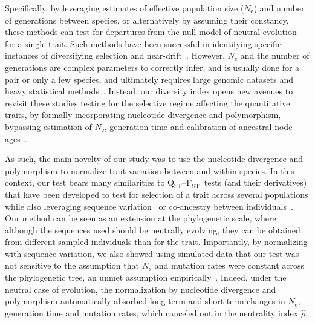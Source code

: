 \documentclass{article}
\newcommand{\Qst}{Q$_\text{ST}$}
\newcommand{\Fst}{F$_\text{ST}$}
\newcommand{\QstFst}{\Qst--\Fst}
\newcommand{\Ne}{N_{\text{e}}}
\newcommand{\NI}{\rho}
\newcommand{\EstNI}{\widehat{\rho}}
\providecommand{\DIFaddtex}[1]{{\protect\color{blue}\uwave{#1}}} %
\providecommand{\DIFdeltex}[1]{{\protect\color{red}\sout{#1}}}                      %
\providecommand{\DIFaddbegin}{} %
\providecommand{\DIFaddend}{} %
\providecommand{\DIFdelbegin}{} %
\providecommand{\DIFdelend}{} %
\providecommand{\DIFadd}[1]{\texorpdfstring{\DIFaddtex{#1}}{#1}} %
\providecommand{\DIFdel}[1]{\texorpdfstring{\DIFdeltex{#1}}{}} %
\newcommand{\DIFscaledelfig}{0.5}
\newlength{\DIFdelgraphicswidth} %
\newlength{\DIFdelgraphicsheight} %
\newcommand{\DIFaddincludegraphics}[2][]{{\color{blue}\fbox{\DIFOincludegraphics[#1]{#2}}}} %
\newcommand{\DIFdelincludegraphics}[2][]{%
\sbox{\DIFdelgraphicsbox}{\DIFOincludegraphics[#1]{#2}}%
\settoboxwidth{\DIFdelgraphicswidth}{\DIFdelgraphicsbox} %
\settoboxtotalheight{\DIFdelgraphicsheight}{\DIFdelgraphicsbox} %
\scalebox{\DIFscaledelfig}{%
\parbox[b]{\DIFdelgraphicswidth}{\usebox{\DIFdelgraphicsbox}\\[-\baselineskip] \rule{\DIFdelgraphicswidth}{0em}}\llap{\resizebox{\DIFdelgraphicswidth}{\DIFdelgraphicsheight}{%
\setlength{\unitlength}{\DIFdelgraphicswidth}%
\begin{picture}(1,1)%
\thicklines\linethickness{2pt} %
{\color[rgb]{1,0,0}\put(0,0){\framebox(1,1){}}}%
{\color[rgb]{1,0,0}\put(0,0){\line( 1,1){1}}}%
{\color[rgb]{1,0,0}\put(0,1){\line(1,-1){1}}}%
\end{picture}%
}\hspace*{3pt}}} %
} %
\DeclareRobustCommand{\DIFaddbegin}{\DIFOaddbegin \let\includegraphics\DIFaddincludegraphics} %
\DeclareRobustCommand{\DIFaddend}{\DIFOaddend \let\includegraphics\DIFOincludegraphics} %
\DeclareRobustCommand{\DIFdelbegin}{\DIFOdelbegin \let\includegraphics\DIFdelincludegraphics} %
\DeclareRobustCommand{\DIFdelend}{\DIFOaddend \let\includegraphics\DIFOincludegraphics} %
\begin{document}
Specifically, by leveraging estimates of effective population size ($\Ne$) and number of generations between species, or alternatively by assuming their constancy, these methods can test for departures from the null model of neutral evolution for a single trait.
Such methods have been successful in identifying specific instances of diversifying selection\DIFaddbegin \DIFadd{~}\DIFaddend \citep{schroeder_evolution_2017, machado_preeminent_2022} and near-drift~\citep{machado_using_2023}.
However, $\Ne$ and the number of generations are complex parameters to correctly infer, and is usually done for a pair or only a few species, and ultimately requires large genomic datasets and heavy statistical methods~\citep{wilder_contribution_2023}.
Instead, our diversity index opens new avenues to revisit these studies testing for the selective regime affecting the quantitative traits, by formally incorporating nucleotide divergence and polymorphism, bypassing estimation of $\Ne$, generation time and calibration of ancestral node ages~\citep{machado_using_2023}.

As such, the main novelty of our study was to use the nucleotide divergence and polymorphism to normalize trait variation between and within species.
In this context, our test bears many similarities to \QstFst\ tests (and their derivatives) that have been developed to test for selection of a trait across several populations while also leveraging sequence variation~\citep{martin_multivariate_2008, leinonen_qst_2013} or co-ancestry between individuals~\citep{ovaskainen_new_2011}.
Our method can be seen as an \DIFdelbegin \DIFdel{extension }\DIFdelend \DIFaddbegin \DIFadd{analog }\DIFaddend at the phylogenetic scale, where although the sequences used should be neutrally evolving, they can be obtained from different sampled individuals than for the trait.
Importantly, by normalizing with sequence variation, we also showed using simulated data that our test was not sensitive to the assumption that $\Ne$ and mutation rates were constant across the phylogenetic tree, an unmet assumption empirically~\citep{bergeron_evolution_2023, wilder_contribution_2023}.
Indeed, under the neutral case of evolution, the normalization by nucleotide divergence and polymorphism automatically absorbed long-term and short-term changes in $\Ne$, generation time and mutation rates, which canceled out in the neutrality index \DIFdelbegin \DIFdel{$\EstNI$}\DIFdelend \DIFaddbegin \DIFadd{$\NI$}\DIFaddend .
\end{document}
